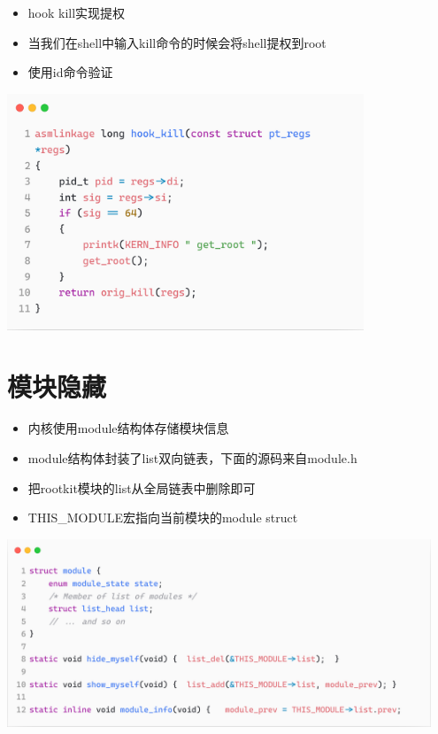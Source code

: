 \documentclass[11pt]{beamer}
\begin{document}
\begin{frame}
	\begin{itemize}
		\item hook kill实现提权
		\item 当我们在shell中输入kill命令的时候会将shell提权到root
		\item 使用id命令验证
	\end{itemize}
	\begin{itemize}
		\centering
		\includegraphics[width=0.80\textwidth]{pic/hookkill.png}
	\end{itemize}
\end{frame}

\section{模块隐藏}

\begin{frame}
	\begin{itemize}
		\item 内核使用module结构体存储模块信息
		\item module结构体封装了list双向链表，下面的源码来自module.h
		\item 把rootkit模块的list从全局链表中删除即可
		\item THIS\_MODULE宏指向当前模块的module struct
	\end{itemize}

\end{frame}

\begin{frame}
\begin{itemize}
	\centering
	\includegraphics[width=0.95\textwidth]{pic/module.png}
\end{itemize}
\end{frame}
\end{document}
